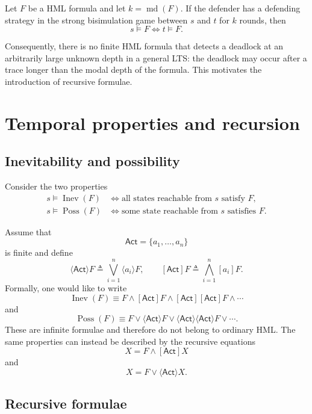 \documentclass[a4paper]{article}
\newcommand{\Act}{\mathsf{Act}}
\newcommand{\md}{\operatorname{md}}
\begin{document}
\begin{snippettheorem}{}
    Let \(F\) be a HML formula and let \(k=\md(F)\).
    If the defender has a defending strategy in the strong bisimulation game between \(s\) and \(t\) for \(k\) rounds, then
    \[
        s\models F
        \iff
        t\models F.
    \]
\end{snippettheorem}

Consequently, there is no finite HML formula that detects a deadlock at an arbitrarily large unknown depth in a general LTS: the deadlock may occur after a trace longer than the modal depth of the formula.
This motivates the introduction of recursive formulae.

\section{Temporal properties and recursion}

\subsection{Inevitability and possibility}

Consider the two properties
\begin{align*}
    s\models\operatorname{Inev}(F)
    &\iff
    \text{all states reachable from }s\text{ satisfy }F,\\
    s\models\operatorname{Poss}(F)
    &\iff
    \text{some state reachable from }s\text{ satisfies }F.
\end{align*}

Assume that
\[
    \Act=\{a_1,\ldots,a_n\}
\]
is finite and define
\[
    \langle\Act\rangle F
    \triangleq
    \bigvee_{i=1}^n\langle a_i\rangle F,
    \qquad
    [\Act]F
    \triangleq
    \bigwedge_{i=1}^n[a_i]F.
\]
Formally, one would like to write
\[
    \operatorname{Inev}(F)
    \equiv
    F\land[\Act]F\land[\Act][\Act]F\land\cdots
\]
and
\[
    \operatorname{Poss}(F)
    \equiv
    F\lor\langle\Act\rangle F
    \lor\langle\Act\rangle\langle\Act\rangle F
    \lor\cdots.
\]
These are infinite formulae and therefore do not belong to ordinary HML.
The same properties can instead be described by the recursive equations
\[
    X = F\land[\Act]X
\]
and
\[
    X = F\lor\langle\Act\rangle X.
\]

\subsection{Recursive formulae}
\end{document}

